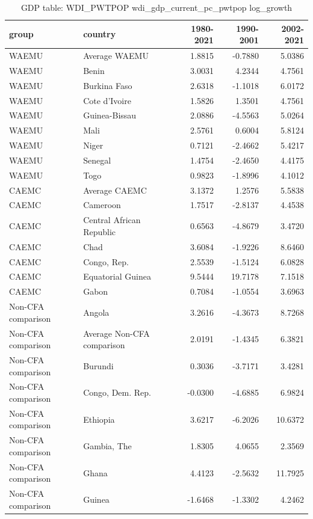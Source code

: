 \begin{table}

\caption{GDP table: WDI_PWTPOP wdi_gdp_current_pc_pwtpop log_growth}
\centering
\begin{tabular}[t]{llrrr}
\toprule
group & country & 1980-2021 & 1990-2001 & 2002-2021\\
\midrule
WAEMU & Average WAEMU & 1.8815 & -0.7880 & 5.0386\\
WAEMU & Benin & 3.0031 & 4.2344 & 4.7561\\
WAEMU & Burkina Faso & 2.6318 & -1.1018 & 6.0172\\
WAEMU & Cote d'Ivoire & 1.5826 & 1.3501 & 4.7561\\
WAEMU & Guinea-Bissau & 2.0886 & -4.5563 & 5.0264\\
\addlinespace
WAEMU & Mali & 2.5761 & 0.6004 & 5.8124\\
WAEMU & Niger & 0.7121 & -2.4662 & 5.4217\\
WAEMU & Senegal & 1.4754 & -2.4650 & 4.4175\\
WAEMU & Togo & 0.9823 & -1.8996 & 4.1012\\
CAEMC & Average CAEMC & 3.1372 & 1.2576 & 5.5838\\
\addlinespace
CAEMC & Cameroon & 1.7517 & -2.8137 & 4.4538\\
CAEMC & Central African Republic & 0.6563 & -4.8679 & 3.4720\\
CAEMC & Chad & 3.6084 & -1.9226 & 8.6460\\
CAEMC & Congo, Rep. & 2.5539 & -1.5124 & 6.0828\\
CAEMC & Equatorial Guinea & 9.5444 & 19.7178 & 7.1518\\
\addlinespace
CAEMC & Gabon & 0.7084 & -1.0554 & 3.6963\\
Non-CFA comparison & Angola & 3.2616 & -4.3673 & 8.7268\\
Non-CFA comparison & Average Non-CFA comparison & 2.0191 & -1.4345 & 6.3821\\
Non-CFA comparison & Burundi & 0.3036 & -3.7171 & 3.4281\\
Non-CFA comparison & Congo, Dem. Rep. & -0.0300 & -4.6885 & 6.9824\\
\addlinespace
Non-CFA comparison & Ethiopia & 3.6217 & -6.2026 & 10.6372\\
Non-CFA comparison & Gambia, The & 1.8305 & 4.0655 & 2.3569\\
Non-CFA comparison & Ghana & 4.4123 & -2.5632 & 11.7925\\
Non-CFA comparison & Guinea & -1.6468 & -1.3302 & 4.2462\\

\end{tabular}
\end{table}
